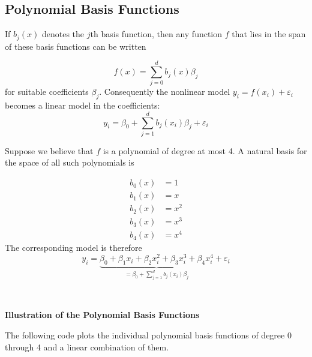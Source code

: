 \documentclass[
]{book}
\begin{document}
\subsection{Polynomial Basis Functions}\label{polynomial-basis-functions}

If \(b_j(x)\) denotes the \(j\)th basis function, then any function \(f\) that lies in the span of these basis functions can be written

\[f(x) = \sum_{j=0}^{d} b_j(x) \beta_j\]
for suitable coefficients \(\beta_j\). Consequently the nonlinear model \(y_i = f(x_i) + \varepsilon_i\) becomes a linear model in the coefficients:
\[y_i = \beta_0 + \sum_{j=1}^{d} b_j(x_i) \beta_j + \varepsilon_i\]

Suppose we believe that \(f\) is a polynomial of degree at most 4. A natural basis for the space of all such polynomials is

\begin{align*}
b_0(x) &= 1\\
b_1(x) &= x\\
b_2(x) &= x^2\\
b_3(x) &= x^3\\
b_4(x) &= x^4
\end{align*}
The corresponding model is therefore
\[y_i = \underbrace{\beta_0 + \beta_1 x_i+\beta_2 x^2_i+ \beta_3 x^3_i + \beta_4 x^4_i}_{= \beta_0 + \sum_{j=1}^{d} b_j(x_i) \beta_j} +\varepsilon_i\]

~

\textbf{Illustration of the Polynomial Basis Functions}

The following code plots the individual polynomial basis functions of degree 0 through 4 and a linear combination of them.
\end{document}
